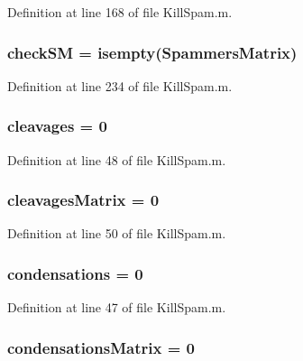 Definition at line 168 of file Kill\-Spam.\-m.

\hypertarget{a00023_ae80cf4c5bf659247b45bbad5d22dec52}{
\subsubsection[{check\-S\-M}]{ check\-S\-M = {\bf isempty}({\bf Spammers\-Matrix})}}\label{a00023_ae80cf4c5bf659247b45bbad5d22dec52}


Definition at line 234 of file Kill\-Spam.\-m.

\hypertarget{a00023_a89060c6979e5a4ff7b0985b35f295695}{
\subsubsection[{cleavages}]{\setlength{\rightskip}{0pt plus 5cm}cleavages = 0}}\label{a00023_a89060c6979e5a4ff7b0985b35f295695}


Definition at line 48 of file Kill\-Spam.\-m.

\hypertarget{a00023_a1a691fb4f955887edfa538e91479fafe}{
\subsubsection[{cleavages\-Matrix}]{\setlength{\rightskip}{0pt plus 5cm}cleavages\-Matrix = 0}}\label{a00023_a1a691fb4f955887edfa538e91479fafe}


Definition at line 50 of file Kill\-Spam.\-m.

\hypertarget{a00023_ad3aa27d88a7e9d77d8334155860269bb}{
\subsubsection[{condensations}]{ condensations = 0}}\label{a00023_ad3aa27d88a7e9d77d8334155860269bb}


Definition at line 47 of file Kill\-Spam.\-m.

\hypertarget{a00023_afaba8eef2f8f4e4dda2e893a19e55a94}{
\subsubsection[{condensations\-Matrix}]{\setlength{\rightskip}{0pt plus 5cm}condensations\-Matrix = 0}}\label{a00023_afaba8eef2f8f4e4dda2e893a19e55a94}


